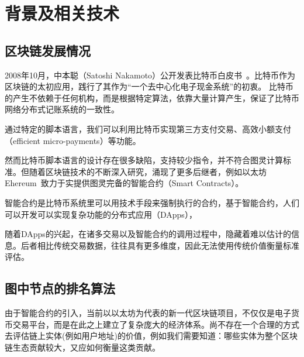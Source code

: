 
\section{背景及相关技术}



\subsection{区块链发展情况}
2008年10月，中本聪（Satoshi Nakamoto）公开发表比特币白皮书~\cite{Nakamoto2008}。比特币作为区块链的太初应用，践行了其作为“一个去中心化电子现金系统”的初衷。 比特币的产生不依赖于任何机构，而是根据特定算法，依靠大量计算产生，保证了比特币网络分布式记账系统的一致性。

通过特定的脚本语言，我们可以利用比特币实现第三方支付交易、高效小额支付（efficient micro-payments）等功能。

然而比特币脚本语言的设计存在很多缺陷，支持较少指令，并不符合图灵计算标准。但随着区块链技术的不断深入研究，涌现了更多后继者，例如以太坊Ehereum~\cite{buterin2013ethereum}致力于实提供图灵完备的智能合约（Smart Contracts）。

智能合约是比特币系统里可以用技术手段来强制执行的合约，基于智能合约，人们可以开发可以实现复杂功能的分布式应用（DApps），

随着DApps的兴起，在诸多交易以及智能合约的调用过程中，隐藏着难以估计的信息。后者相比传统交易数据，往往具有更多维度，因此无法使用传统价值衡量标准评估。





\subsection{图中节点的排名算法}
由于智能合约的引入，当前以以太坊为代表的新一代区块链项目，不仅仅是电子货币交易平台，而是在此之上建立了复杂庞大的经济体系。尚不存在一个合理的方式去评估链上实体(例如用户地址)的价值，例如我们需要知道：哪些实体为整个区块链生态贡献较大，又应如何衡量这类贡献。

